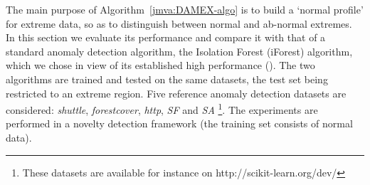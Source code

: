  The main purpose of Algorithm~\ref{jmva:DAMEX-algo} is to build a 
 `normal profile' for 
extreme data, so as to distinguish between normal and ab-normal
extremes. 
In this section we evaluate its performance %
 and compare it with that of a standard anomaly detection algorithm, %
the Isolation Forest (iForest)
algorithm, which we chose in view of its
established high performance (\cite{Liu2008}). 
The two algorithms are trained and tested on the same datasets, the
test set being restricted to an  extreme region.
 Five reference anomaly detection datasets  are considered:
 \emph{shuttle}, \emph{forestcover}, \emph{http},
 \emph{SF} and \emph{SA} \footnote{These datasets are available for instance on http://scikit-learn.org/dev/ }. The experiments are performed in a
 novelty detection framework (the training set consists of normal data). 
%
%

